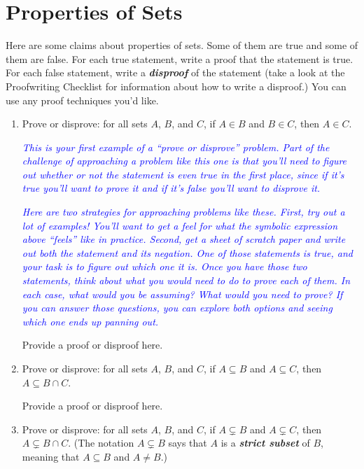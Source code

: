 \documentclass{article}
\renewcommand{\(}{\left(}
\renewcommand{\)}{\right)}
\theoremstyle{plain}
\theoremstyle{plain}
\theoremstyle{definition}
\begin{document}
\section{Properties of Sets}

Here are some claims about properties of sets. Some of them are true and some of them are false. For each true statement, write a proof that the statement is true. For each false statement, write a \textit{\textbf{disproof}} of the statement (take a look at the Proofwriting Checklist for information about how to write a disproof.) You can use any proof techniques you'd like.
\begin{enumerate}[label*=\roman*.,ref=\roman*]

\item Prove or disprove: for all sets $A$, $B$, and $C$,
if $A \in B$ and $B \in C$, then $A \in C$.

\textit{\textcolor{blue}{ This is your first example of a ``prove or disprove'' problem. 
Part of the challenge of approaching a problem like this one is that you'll need to figure out whether or not the statement is even true in the first place, since if it's true you'll want to prove it and if it's false you'll want to disprove it. }}

\textit{\textcolor{blue}{ Here are two strategies for approaching problems like these. 
First, try out a lot of examples! You'll want to
get a feel for what the symbolic expression above ``feels'' like in practice. Second, get a sheet of scratch paper
and write out both the statement and its negation. One of those statements is true, and your task is to
figure out which one it is. Once you have those two statements, think about what you would need to do to
prove each of them. In each case, what would you be assuming? What would you need to prove? If you
can answer those questions, you can explore both options and seeing which one ends up panning out. }}

\begin{shaded}
Provide a proof or disproof here.
\end{shaded}

\item Prove or disprove: for all sets $A$, $B$, and $C$, if $A \subseteq B$ and $A \subseteq C$, then $A \subseteq B \cap C$.

\begin{shaded}
Provide a proof or disproof here.
\end{shaded}

\item Prove or disprove: for all sets $A$, $B$, and $C$, if $A \subsetneq B$ and $A \subsetneq C$, then $A \subsetneq B \cap C$. (The notation $A \subsetneq B$ says that $A$ is a \textit{\textbf{strict subset}} of $B$, meaning that $A \subseteq B$ and $A \neq B$.)


\end{enumerate}
\end{document}
